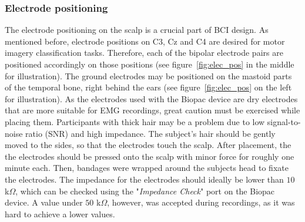 \documentclass[a4paper,oneside, openright,12pt]{report}
\begin{document}
\subsubsection*{Electrode positioning}
The electrode positioning on the scalp is a crucial part of BCI design. As mentioned before, electrode positions on C3, Cz and C4 are desired for motor imagery classification tasks. Therefore, each of the bipolar electrode pairs are positioned accordingly on those positions (see figure~\ref{fig:elec_pos} in the middle for illustration). The ground electrodes may be positioned on the mastoid parts of the temporal bone, right behind the ears (see figure~\ref{fig:elec_pos} on the left for illustration). As the electrodes used with the Biopac device are dry electrodes that are more suitable for EMG recordings, great caution must be exercised while placing them. Participants with thick hair may be a problem due to low signal-to-noise ratio (SNR) and high impedance. The subject's hair should be gently moved to the sides, so that the electrodes touch the scalp. After placement, the the electrodes should be pressed onto the scalp with minor force for roughly one minute each. Then, bandages were wrapped around the subjects head to fixate the electrodes. The impedance for the electrodes should ideally be lower than $10$ k$\Omega$, which can be checked using the "\textit{Impedance Check}" port on the Biopac device. A value under $50$ k$\Omega$, however, was accepted during recordings, as it was hard to achieve a lower values.\\ 
\end{document}
